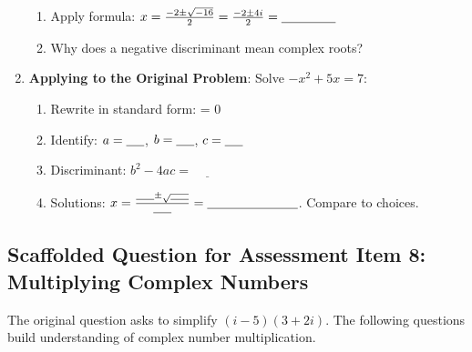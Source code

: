 \documentclass[12pt]{article}
\begin{document}
\begin{enumerate}[label=6.\arabic*]
\begin{enumerate}[label=\alph*)]
        \item Apply formula: \( x = \frac{-2 \pm \sqrt{-16}}{2} = \frac{-2 \pm 4i}{2} = \underline{\hspace{1.5cm}} \)
        \item Why does a negative discriminant mean complex roots? \underline{\hspace{4cm}}
    \end{enumerate}
    \item \textbf{Applying to the Original Problem}: Solve \( -x^2 + 5x = 7 \):
    \begin{enumerate}[label=\alph*)]
        \item Rewrite in standard form: \underline{\hspace{2.5cm}} = 0
        \item Identify: \( a = \underline{\hspace{0.5cm}} \), \( b = \underline{\hspace{0.5cm}} \), \( c = \underline{\hspace{0.5cm}} \)
        \item Discriminant: \( b^2 - 4ac = \underline{\hspace{1cm}} \)
        \item Solutions: \( x = \frac{\underline{\hspace{0.5cm}} \pm \sqrt{\underline{\hspace{0.5cm}}}}{\underline{\hspace{0.5cm}}} = \underline{\hspace{2.5cm}} \). Compare to choices.
    \end{enumerate}
\end{enumerate}

\subsection*{Scaffolded Question for Assessment Item 8: Multiplying Complex Numbers}
The original question asks to simplify \( (i - 5)(3 + 2i) \). The following questions build understanding of complex number multiplication.
\end{document}
